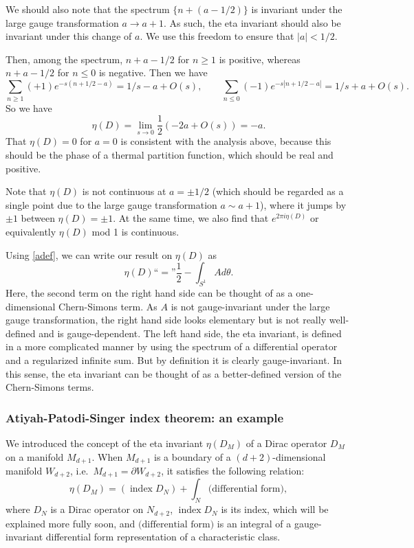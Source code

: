 \documentclass[12pt]{article}
\numberwithin{equation}{section}
\numberwithin{figure}{section}
\theoremstyle{remark}
\def\index{\mathop{\mathrm{index}}}
\begin{document}
We should also note that the spectrum $\{ n+(a-1/2)\}$ is invariant under the large gauge transformation $a\to a+1$.
As such, the eta invariant should also be invariant under this change of $a$.
We use this freedom to ensure that $|a|<1/2$.

Then, among the spectrum, $n+a-1/2$ for $  n\ge 1$ is positive, whereas $n+a-1/2$ for $n\le 0$ is negative.
Then we have \begin{equation}
\sum_{n\ge 1} (+1) e^{-s(n+1/2-a)} = 1/s-a+ O(s),\qquad
\sum_{n\le 0} (-1)e^{-s|n+1/2-a|}= 1/s+a+O(s).
\end{equation}
So we have \begin{equation}
  \eta(D)=\lim_{s\to 0}\frac12 (-2a+O(s)) = -a.
\end{equation}
That $\eta(D)=0$ for $a=0$ is consistent with the analysis above, because this should be the phase of a
thermal partition function, which should be real and positive.

Note that $\eta(D)$ is not continuous at $a=\pm 1/2$ 
(which should be regarded as a single point due to the large gauge transformation $a\sim a+1$),
where it jumps by $\pm1$ between $\eta(D)=\pm1$.
At the same time, we also find that $e^{2\pi i\eta(D)}$ 
or equivalently $\eta(D)$ mod 1 is continuous. 

Using \eqref{adef}, we can write our result on $\eta(D)$ as \begin{equation}
\eta(D) \text{``}=\text{''}\frac12 -\int_{S^1} A d\theta.
\end{equation}
Here, the second term on the right hand side can be thought of as a one-dimensional
Chern-Simons term. 
As $A$ is not gauge-invariant under the large gauge transformation,
the right hand side looks elementary but is not really well-defined and is gauge-dependent. 
The left hand side, the eta invariant, is defined in a more complicated manner
by using the spectrum of a differential operator and a regularized infinite sum.
But by definition it is clearly gauge-invariant.
In this sense, the eta invariant can be thought of as a better-defined version of the
Chern-Simons terms. 

\subsubsection{Atiyah-Patodi-Singer index theorem: an example}
\label{sec:AC}

We introduced the concept of the eta invariant $\eta(D_M)$ of a Dirac operator $D_M$ on a manifold $M_{d+1}$.
When $M_{d+1}$ is a boundary of a $(d+2)$-dimensional manifold $W_{d+2}$, i.e.~$M_{d+1}=\partial W_{d+2}$,
it satisfies the following relation: \begin{equation}
\eta(D_M)= (\index D_N) + \int_{N} \text{(differential form)},
\label{APS}
\end{equation}
where $D_N$ is a Dirac operator on $N_{d+2}$, 
$\index D_N$ is its index, which will be explained more fully soon, and
$\text{(differential form)}$ is an integral of a gauge-invariant differential 
form representation of a characteristic class.
\end{document}
